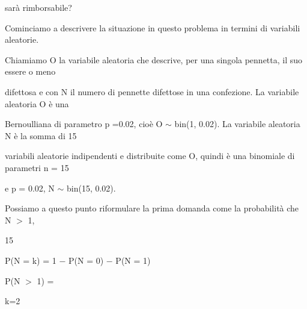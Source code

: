 \documentclass[a4paper,portrait,12pt]{article}
\begin{document}
\begin{flushleft}
sar\`{a} rimborsabile?
\end{flushleft}


\begin{flushleft}
Cominciamo a descrivere la situazione in questo problema in termini di variabili aleatorie.
\end{flushleft}


\begin{flushleft}
Chiamiamo O la variabile aleatoria che descrive, per una singola pennetta, il suo essere o meno
\end{flushleft}


\begin{flushleft}
difettosa e con N il numero di pennette difettose in una confezione. La variabile aleatoria O \`{e} una
\end{flushleft}


\begin{flushleft}
Bernoulliana di parametro p =0.02, cio\`{e} O $\sim$ bin(1, 0.02). La variabile aleatoria N \`{e} la somma di 15
\end{flushleft}


\begin{flushleft}
variabili aleatorie indipendenti e distribuite come O, quindi \`{e} una binomiale di parametri n = 15
\end{flushleft}


\begin{flushleft}
e p = 0.02, N $\sim$ bin(15, 0.02).
\end{flushleft}


\begin{flushleft}
Possiamo a questo punto riformulare la prima domanda come la probabilit\`{a} che N $>$ 1,
\end{flushleft}


15





\begin{flushleft}
P(N = k) = 1 $-$ P(N = 0) $-$ P(N = 1)
\end{flushleft}





\begin{flushleft}
P(N $>$ 1) =
\end{flushleft}


\begin{flushleft}
k=2
\end{flushleft}
\end{document}
